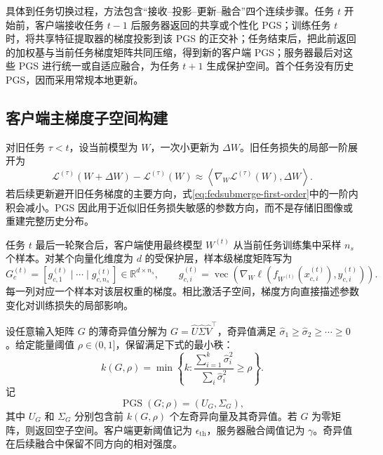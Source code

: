 具体到任务切换过程，方法包含“接收--投影--更新--融合”四个连续步骤。任务 $t$ 开始前，客户端接收任务 $t-1$ 后服务器返回的共享或个性化 PGS；训练任务 $t$ 时，将共享特征提取器的梯度投影到该 PGS 的正交补；任务结束后，把此前返回的加权基与当前任务梯度矩阵共同压缩，得到新的客户端 PGS；服务器最后对这些 PGS 进行统一或自适应融合，为任务 $t+1$ 生成保护空间。首个任务没有历史 PGS，因而采用常规本地更新。

\subsection{客户端主梯度子空间构建}
\label{subsec:fedsubmerge-client-pgs}

对旧任务 $\tau<t$，设当前模型为 $W$，一次小更新为 $\Delta W$。旧任务损失的局部一阶展开为
\begin{equation}
\mathcal{L}^{(\tau)}(W+\Delta W)
-
\mathcal{L}^{(\tau)}(W)
\approx
\left\langle
\nabla_W\mathcal{L}^{(\tau)}(W),\Delta W
\right\rangle.
\label{eq:fedsubmerge-first-order}
\end{equation}
若后续更新避开旧任务梯度的主要方向，式\eqref{eq:fedsubmerge-first-order}中的一阶内积会减小。PGS 因此用于近似旧任务损失敏感的参数方向，而不是存储旧图像或重建完整历史分布。

任务 $t$ 最后一轮聚合后，客户端使用最终模型 $W^{(t)}$ 从当前任务训练集中采样 $n_s$ 个样本。对某个向量化维度为 $d$ 的受保护层，样本级梯度矩阵写为
\begin{equation}
G_c^{(t)}
=
\left[
 g_{c,1}^{(t)}\mid\cdots\mid g_{c,n_s}^{(t)}
\right]
\in\mathbb{R}^{d\times n_s},
\qquad
 g_{c,i}^{(t)}
=
\operatorname{vec}\!\left(
\nabla_W\ell\!\left(f_{W^{(t)}}(x_{c,i}^{(t)}),y_{c,i}^{(t)}\right)
\right).
\label{eq:fedsubmerge-gradient-matrix}
\end{equation}
每一列对应一个样本对该层权重的梯度。相比激活子空间，梯度方向直接描述参数变化对训练损失的局部影响。

设任意输入矩阵 $G$ 的薄奇异值分解为
$G=\widehat U\widehat\Sigma\widehat V^{\top}$，奇异值满足
$\widehat\sigma_1\geq\widehat\sigma_2\geq\cdots\geq0$。给定能量阈值 $\rho\in(0,1]$，保留满足下式的最小秩：
\begin{equation}
k(G,\rho)
=
\min\left\{k:
\frac{\sum_{i=1}^{k}\widehat\sigma_i^2}
     {\sum_i\widehat\sigma_i^2}
\geq\rho
\right\}.
\label{eq:fedsubmerge-energy-rule}
\end{equation}
记
\begin{equation}
\operatorname{PGS}(G;\rho)=(U_G,\Sigma_G),
\label{eq:fedsubmerge-pgs-operator}
\end{equation}
其中 $U_G$ 和 $\Sigma_G$ 分别包含前 $k(G,\rho)$ 个左奇异向量及其奇异值。若 $G$ 为零矩阵，则返回空子空间。客户端更新阈值记为 $\epsilon_{\mathrm{th}}$，服务器融合阈值记为 $\gamma$。奇异值在后续融合中保留不同方向的相对强度。

